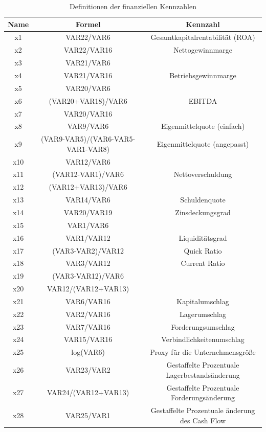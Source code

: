 \documentclass{article}
\begin{document}
\begin{table}
\begin{center}
\centering
\caption{Definitionen der finanziellen Kennzahlen}
\scriptsize
\vspace{1mm}
\begin{tabular}{ccc}
\hline\hline
Name & Formel & Kennzahl \\
\hline
x1 & VAR22/VAR6 & Gesamtkapitalrentabilit{\"a}t (ROA) \\
x2 & VAR22/VAR16 & Nettogewinnmarge \\
x3 & VAR21/VAR6 & \\
x4 & VAR21/VAR16 & Betriebsgewinnmarge \\
x5 & VAR20/VAR6 & \\
x6 & (VAR20+VAR18)/VAR6 & EBITDA \\
x7 & VAR20/VAR16 & \\
x8 & VAR9/VAR6 & Eigenmittelquote (einfach)\\
x9 & (VAR9-VAR5)/(VAR6-VAR5-VAR1-VAR8) & Eigenmittelquote (angepasst) \\
x10 & VAR12/VAR6 & \\
x11 & (VAR12-VAR1)/VAR6 & Nettoverschuldung \\
x12 & (VAR12+VAR13)/VAR6 & \\
x13 & VAR14/VAR6 & Schuldenquote \\
x14 & VAR20/VAR19 & Zinsdeckungsgrad \\
x15 & VAR1/VAR6 & \\
x16 & VAR1/VAR12 & Liquidit{\"a}tsgrad \\
x17 & (VAR3-VAR2)/VAR12 & Quick Ratio \\
x18 & VAR3/VAR12 & Current Ratio \\
x19 & (VAR3-VAR12)/VAR6 & \\
x20 & VAR12/(VAR12+VAR13) & \\
x21 & VAR6/VAR16 & Kapitalumschlag \\
x22 & VAR2/VAR16 & Lagerumschlag \\
x23 & VAR7/VAR16 & Forderungsumschlag \\
x24 & VAR15/VAR16 & Verbindlichkeitenumschlag \\
x25 & log(VAR6) & Proxy f{\"u}r die Unternehmensgr{\"o}{\ss}e \\
x26 & VAR23/VAR2 & Gestaffelte Prozentuale Lagerbestands{\"a}nderung \\
x27 & VAR24/(VAR12+VAR13) & Gestaffelte Prozentuale Forderungs{\"a}nderung \\
x28 & VAR25/VAR1 & Gestaffelte Prozentuale {\"a}nderung des Cash Flow \\
\hline\hline
\end{tabular}
\end{center}
\end{table}
\end{document}
